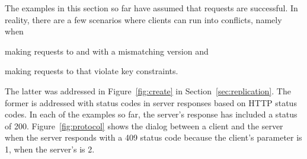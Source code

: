 The examples in this section so far have assumed that requests are successful.
In reality, there are a few scenarios where clients can run into conflicts,
namely when
\begin{inparaenum}
\item making requests to \sync and \create with a mismatching version and
\item making requests to \create that violate key constraints. 
\end{inparaenum}
The latter was addressed in Figure~\ref{fig:create} in
Section~\ref{sec:replication}. The former is addressed with status codes in
server responses based on HTTP status codes. In each of the examples so far, the server's response has
included a status of 200. Figure~\ref{fig:protocol} shows the dialog between a
client and the server when the server responds with a 409 status code because the
client's  parameter is 1, when the server's is 2.



